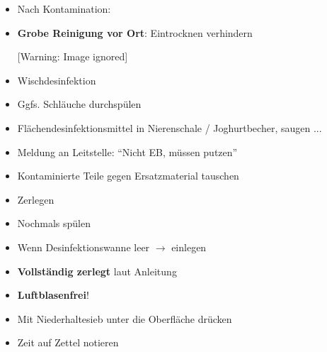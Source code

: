 \documentclass{article}
\makeatletter
\newcommand\gEs[1]{\textbf{\textcolor[rgb]{0.0,0.0,0.5019608}{#1}}}
\newcommand\gEs[1]{\textbf{\textcolor[rgb]{0.0,0.0,0.5019608}{#1}}}
\newcommand\captionof[1]{\def\@captype{#1}\caption}
\makeatother
\begin{document}
\begin{itemize}
\item {\mdseries
Nach Kontamination:}

\end{itemize}
\begin{itemize}
\item {\mdseries
\textbf{Grobe Reinigung vor Ort}: Eintrocknen verhindern}

\begin{center}
 [Warning: Image ignored] %
\captionof{figure}[Desinfektionswannen, verschiedene
Gr\"o{\ss}en]{Desinfektionswannen, verschiedene Gr\"o{\ss}en}

\end{center}
\end{itemize}
\begin{itemize}
\item {\mdseries
Wischdesinfektion}

\item {\mdseries
Ggfs. Schl\"auche durchsp\"ulen}

\item {\mdseries
Fl\"achendesinfektionsmittel in Nierenschale / Joghurtbecher, saugen
...}

\end{itemize}
\begin{itemize}
\item {\mdseries
Meldung an Leitstelle: {\textquotedblleft}Nicht EB, m\"ussen
putzen{\textquotedblright}}

\item {\mdseries
Kontaminierte Teile gegen Ersatzmaterial tauschen}

\end{itemize}
\begin{itemize}
\item {\mdseries
Zerlegen}

\item {\mdseries
Nochmals sp\"ulen}

\end{itemize}
\begin{itemize}
\item {\mdseries
Wenn Desinfektionswanne leer ${\rightarrow}$ einlegen }

\end{itemize}
\begin{itemize}
\item {\mdseries
\gEs{Vollst\"andig zerlegt} laut Anleitung}

\item {\mdseries
\gEs{Luftblasenfrei}!}

\item {\mdseries
Mit Niederhaltesieb unter die Oberfl\"ache dr\"ucken}

\item {\mdseries
Zeit auf Zettel notieren }

\end{itemize}
\end{document}
